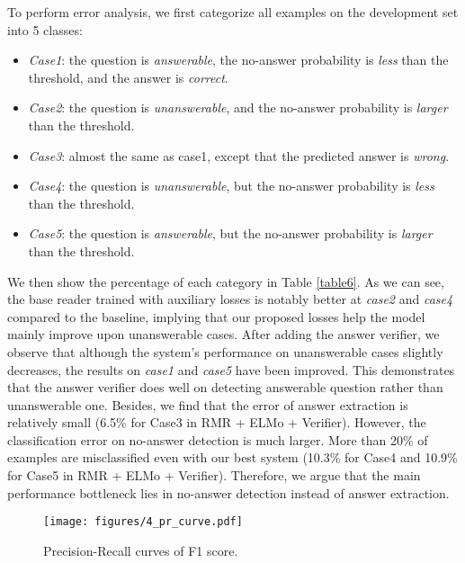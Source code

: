 \documentclass[letterpaper]{article} \usepackage{aaai19}  \usepackage{times}  \usepackage{helvet}  \usepackage{courier}  \usepackage{url}  \usepackage{graphicx}  \usepackage{pbox}
\begin{document}
To perform error analysis, we first categorize all examples on the development set into 5 classes: 
\begin{itemize}
\item \emph{Case1}: the question is \emph{answerable}, the no-answer probability is \emph{less} than the threshold, and the answer is \emph{correct}. 
\item \emph{Case2}: the question is \emph{unanswerable}, and the no-answer probability is \emph{larger} than the threshold.
\item \emph{Case3}: almost the same as case1, except that the predicted answer is \emph{wrong}.
\item \emph{Case4}: the question is \emph{unanswerable}, but the no-answer probability is \emph{less} than the threshold.
\item \emph{Case5}: the question is \emph{answerable}, but the no-answer probability is \emph{larger} than the threshold.
\end{itemize}


We then show the percentage of each category in Table \ref{table6}. 
As we can see, the base reader trained with auxiliary losses is notably better at \emph{case2} and \emph{case4} compared to the baseline, implying that our proposed losses help the model mainly improve upon unanswerable cases.
After adding the answer verifier, we observe that although the system's performance on unanswerable cases slightly decreases, the results on \emph{case1} and \emph{case5} have been improved.
This demonstrates that the answer verifier does well on detecting answerable question rather than unanswerable one.
Besides, we find that the error of answer extraction is relatively small (6.5\% for Case3 in RMR + ELMo + Verifier).
However, the classification error on no-answer detection is much larger. More than 20\% of examples are misclassified even with our best system (10.3\% for Case4 and 10.9\% for Case5 in RMR + ELMo + Verifier).
Therefore, we argue that the main performance bottleneck lies in no-answer detection instead of answer extraction.

\begin{figure}
\begin{center}
\texttt{[image: figures/4\_pr\_curve.pdf]}
\vspace{-0.1cm}
\caption{Precision-Recall curves of F1 score.}
\label{fig3}
\vspace{-0.5cm}
\end{center}
\end{figure}
\end{document}
